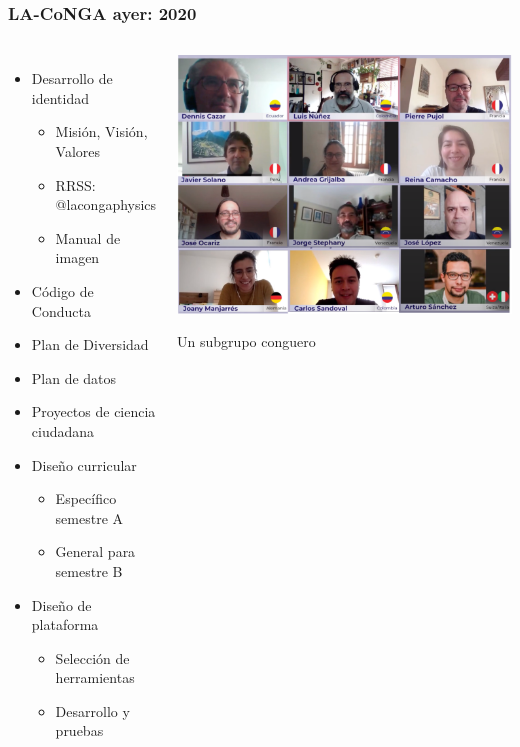 \begin{frame}[fragile]
\frametitle{LA-CoNGA ayer: 2020}
\begin{columns}[c] %
\begin{itemize}
	\item Desarrollo de identidad
	\begin{itemize}
		\item Misión, Visión, Valores
		\item RRSS: @lacongaphysics
		\item Manual de imagen
		\end{itemize}
	\item Código de Conducta
	\item Plan de Diversidad
	\item Plan de datos
	\item Proyectos de ciencia ciudadana
	\item Diseño curricular
	\begin{itemize}
		\item Específico semestre A
		\item General para semestre B
		\end{itemize}
	\item Diseño de plataforma
	\begin{itemize}
		\item Selección de herramientas
		\item Desarrollo y pruebas
		\end{itemize}
	\end{itemize}
\begin{center}
\includegraphics[scale=0.21]{imagenes/TodosLaConga2020_4x3.png}
\vspace{0.05cm}
	
{\tiny Un subgrupo conguero}
\end{center}

\end{columns}
\end{frame}

